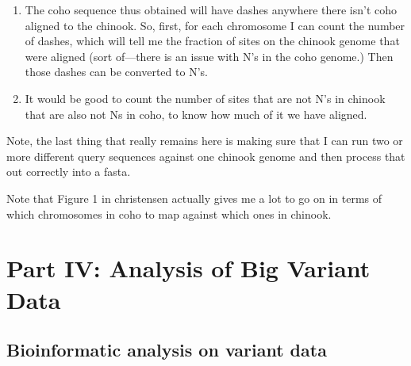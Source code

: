 \documentclass[]{krantz}
\makeatletter
\newenvironment{Shaded}{\begin{snugshade}}{\end{snugshade}}
\newcommand{\CommentTok}[1]{\textcolor[rgb]{0.37,0.37,0.37}{\textit{#1}}}
\newcommand{\ExtensionTok}[1]{#1}
\newcommand{\FunctionTok}[1]{\textcolor[rgb]{0,0,0}{#1}}
\newcommand{\KeywordTok}[1]{\textcolor[rgb]{0.27,0.27,0.27}{\textbf{#1}}}
\newcommand{\NormalTok}[1]{#1}
\newcommand{\OperatorTok}[1]{\textcolor[rgb]{0.43,0.43,0.43}{\textbf{#1}}}
\newcommand{\StringTok}[1]{\textcolor[rgb]{0.5,0.5,0.5}{#1}}
\providecommand{\tightlist}{%
  \setlength{\itemsep}{0pt}\setlength{\parskip}{0pt}}
\newenvironment{kframe}{%
\medskip{}
\setlength{\fboxsep}{.8em}
 \def\at@end@of@kframe{}%
 \ifinner\ifhmode%
  \def\at@end@of@kframe{\end{minipage}}%
  \begin{minipage}{\columnwidth}%
 \fi\fi%
 \def\FrameCommand##1{\hskip\@totalleftmargin \hskip-\fboxsep
 \colorbox{shadecolor}{##1}\hskip-\fboxsep
     \hskip-\linewidth \hskip-\@totalleftmargin \hskip\columnwidth}%
 \MakeFramed {\advance\hsize-\width
   \@totalleftmargin\z@ \linewidth\hsize
   \@setminipage}}%
 {\par\unskip\endMakeFramed%
 \at@end@of@kframe}
\renewenvironment{Shaded}{\begin{kframe}}{\end{kframe}}
\makeatother
\begin{document}
\begin{Shaded}
\end{Shaded}

\begin{enumerate}
\def\labelenumi{\arabic{enumi}.}
\setcounter{enumi}{6}
\tightlist
\item
  The coho sequence thus obtained will have dashes anywhere there isn't coho aligned
  to the chinook. So, first, for each chromosome I can count the number of dashes, which
  will tell me the fraction of sites on the chinook genome that were aligned (sort of---there is an issue with N's in the coho genome.) Then those dashes can be converted to N's.
\item
  It would be good to count the number of sites that are not N's in chinook that are also
  not Ns in coho, to know how much of it we have aligned.
\end{enumerate}

Note, the last thing that really remains here is making sure that I can run two or more different query sequences against one chinook genome and then process that out correctly
into a fasta.

Note that Figure 1 in christensen actually gives me a lot to go on in terms of which
chromosomes in coho to map against which ones in chinook.

\hypertarget{part-part-iv-analysis-of-big-variant-data}{%
\part{Part IV: Analysis of Big Variant Data}\label{part-part-iv-analysis-of-big-variant-data}}

\hypertarget{bioinformatic-analysis-on-variant-data}{%
\chapter{Bioinformatic analysis on variant data}\label{bioinformatic-analysis-on-variant-data}}
\end{document}
